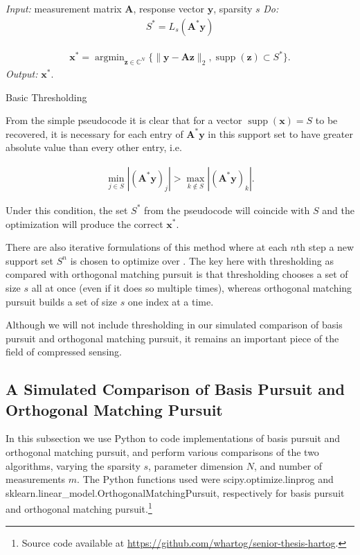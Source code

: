 \documentclass[12pt,a4paper]{amsart}
\numberwithin{equation}{section}
\theoremstyle{plain}
\theoremstyle{definition}
\newcommand{\BC}{\mathbb C}
\newcommand{\bdy}{\mathbf{y}}
\newcommand{\bdx}{\mathbf{x}}
\newcommand{\bdz}{\mathbf{z}}
\newcommand{\bdA}{\mathbf{A}}
\DeclareMathOperator{\argmin}{argmin}
\DeclareMathOperator{\supp}{supp}
\begin{document}
\begin{algorithm}
 \textit{Input:} measurement matrix $\bdA$, response vector $\bdy$, sparsity $s$\;
 \textit{Do:}
 \begin{align*}
     S^*=L_s(\bdA^*\bdy)
 \end{align*}
 
 \begin{align*}
     \bdx^*=\argmin_{\bdz\in\BC^N}\{\|\bdy-\bdA\bdz\|_2,\supp(\bdz)\subset S^*\}.
 \end{align*}
\textit{Output:} $\bdx^*$.
 \caption{Basic Thresholding}
\end{algorithm}

From the simple pseudocode it is clear that for a vector $\supp(\bdx)=S$ to be recovered, it is necessary for each entry of $\bdA^*\bdy$ in this support set to have greater absolute value than every other entry, i.e.

\begin{align*}
    \min_{j\in S}|(\bdA^*\bdy)_j|>\max_{k\notin S}|(\bdA^*\bdy)_k|.
\end{align*}

Under this condition, the set $S^*$ from the pseudocode will coincide with $S$ and the optimization will produce the correct $\bdx^*$.

There are also iterative formulations of this method where at each $n$th step a new support set $S^n$ is chosen to optimize over \cite{fou-rau}. The key here with thresholding as compared with orthogonal matching pursuit is that thresholding chooses a set of size $s$ all at once (even if it does so multiple times), whereas orthogonal matching pursuit builds a set of size $s$ one index at a time.

Although we will not include thresholding in our simulated comparison of basis pursuit and orthogonal matching pursuit, it remains an important piece of the field of compressed sensing.

\subsection{A Simulated Comparison of Basis Pursuit and Orthogonal Matching Pursuit}\label{omp-bp-comparison}

In this subsection we use Python to code implementations of basis pursuit and orthogonal matching pursuit, and perform various comparisons of the two algorithms, varying the sparsity $s$, parameter dimension $N$, and number of measurements $m$. The Python functions used were scipy.optimize.linprog and sklearn.linear\_model.OrthogonalMatchingPursuit, respectively for basis pursuit and orthogonal matching pursuit.\footnote{Source code available at \href{https://github.com/whartog/senior-thesis-hartog}{https://github.com/whartog/senior-thesis-hartog}.}
\end{document}
